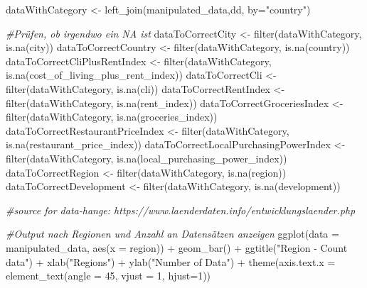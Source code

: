 \documentclass[
  11pt,
  a4paper,
  twoside]{scrbook}
\newenvironment{Shaded}{\begin{snugshade}}{\end{snugshade}}
\newcommand{\AttributeTok}[1]{\textcolor[rgb]{0.77,0.63,0.00}{#1}}
\newcommand{\CommentTok}[1]{\textcolor[rgb]{0.56,0.35,0.01}{\textit{#1}}}
\newcommand{\DecValTok}[1]{\textcolor[rgb]{0.00,0.00,0.81}{#1}}
\newcommand{\FunctionTok}[1]{\textcolor[rgb]{0.00,0.00,0.00}{#1}}
\newcommand{\NormalTok}[1]{#1}
\newcommand{\OtherTok}[1]{\textcolor[rgb]{0.56,0.35,0.01}{#1}}
\newcommand{\SpecialCharTok}[1]{\textcolor[rgb]{0.00,0.00,0.00}{#1}}
\newcommand{\StringTok}[1]{\textcolor[rgb]{0.31,0.60,0.02}{#1}}
\begin{document}
\begin{Shaded}
\begin{Highlighting}[]
\NormalTok{dataWithCategory }\OtherTok{\textless{}{-}} \FunctionTok{left\_join}\NormalTok{(manipulated\_data,dd, }\AttributeTok{by=}\StringTok{"country"}\NormalTok{)}

\CommentTok{\#Prüfen, ob irgendwo ein \textquotesingle{}NA\textquotesingle{} ist}
\NormalTok{dataToCorrectCity }\OtherTok{\textless{}{-}} \FunctionTok{filter}\NormalTok{(dataWithCategory, }\FunctionTok{is.na}\NormalTok{(city))}
\NormalTok{dataToCorrectCountry }\OtherTok{\textless{}{-}} \FunctionTok{filter}\NormalTok{(dataWithCategory, }\FunctionTok{is.na}\NormalTok{(country))}
\NormalTok{dataToCorrectCliPlusRentIndex }\OtherTok{\textless{}{-}} \FunctionTok{filter}\NormalTok{(dataWithCategory, }\FunctionTok{is.na}\NormalTok{(cost\_of\_living\_plus\_rent\_index))}
\NormalTok{dataToCorrectCli }\OtherTok{\textless{}{-}} \FunctionTok{filter}\NormalTok{(dataWithCategory, }\FunctionTok{is.na}\NormalTok{(cli))}
\NormalTok{dataToCorrectRentIndex }\OtherTok{\textless{}{-}} \FunctionTok{filter}\NormalTok{(dataWithCategory, }\FunctionTok{is.na}\NormalTok{(rent\_index))}
\NormalTok{dataToCorrectGroceriesIndex }\OtherTok{\textless{}{-}} \FunctionTok{filter}\NormalTok{(dataWithCategory, }\FunctionTok{is.na}\NormalTok{(groceries\_index))}
\NormalTok{dataToCorrectRestaurantPriceIndex }\OtherTok{\textless{}{-}} \FunctionTok{filter}\NormalTok{(dataWithCategory, }\FunctionTok{is.na}\NormalTok{(restaurant\_price\_index))}
\NormalTok{dataToCorrectLocalPurchasingPowerIndex }\OtherTok{\textless{}{-}} \FunctionTok{filter}\NormalTok{(dataWithCategory, }\FunctionTok{is.na}\NormalTok{(local\_purchasing\_power\_index))}
\NormalTok{dataToCorrectRegion }\OtherTok{\textless{}{-}} \FunctionTok{filter}\NormalTok{(dataWithCategory, }\FunctionTok{is.na}\NormalTok{(region))}
\NormalTok{dataToCorrectDevelopment }\OtherTok{\textless{}{-}} \FunctionTok{filter}\NormalTok{(dataWithCategory, }\FunctionTok{is.na}\NormalTok{(development))}

\CommentTok{\#source for data{-}hange: https://www.laenderdaten.info/entwicklungslaender.php}



\CommentTok{\#Output nach Regionen und Anzahl an Datensätzen anzeigen}
\FunctionTok{ggplot}\NormalTok{(}\AttributeTok{data =}\NormalTok{ manipulated\_data, }\FunctionTok{aes}\NormalTok{(}\AttributeTok{x =}\NormalTok{ region)) }\SpecialCharTok{+}
  \FunctionTok{geom\_bar}\NormalTok{() }\SpecialCharTok{+}
  \FunctionTok{ggtitle}\NormalTok{(}\StringTok{"Region {-} Count data"}\NormalTok{) }\SpecialCharTok{+}
  \FunctionTok{xlab}\NormalTok{(}\StringTok{"Regions"}\NormalTok{) }\SpecialCharTok{+}
  \FunctionTok{ylab}\NormalTok{(}\StringTok{"Number of Data"}\NormalTok{) }\SpecialCharTok{+}
  \FunctionTok{theme}\NormalTok{(}\AttributeTok{axis.text.x =} \FunctionTok{element\_text}\NormalTok{(}\AttributeTok{angle =} \DecValTok{45}\NormalTok{, }\AttributeTok{vjust =} \DecValTok{1}\NormalTok{, }\AttributeTok{hjust=}\DecValTok{1}\NormalTok{))}
\end{Highlighting}
\end{Shaded}
\end{document}
